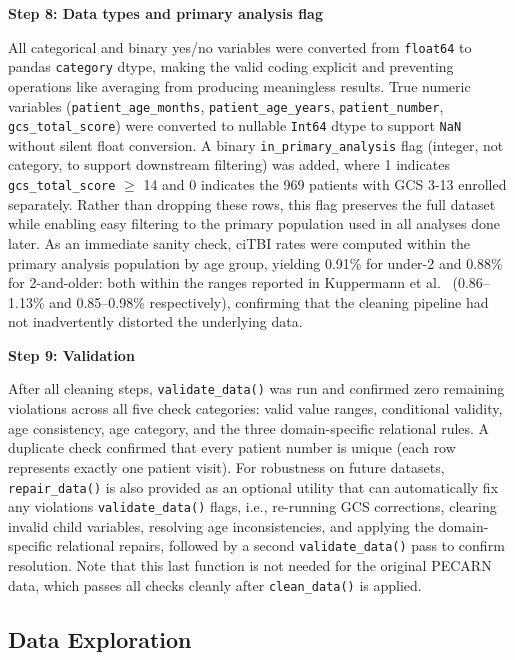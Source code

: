 \documentclass[11pt,letterpaper]{article}
\begin{document}
\textbf{Step 8: Data types and primary analysis flag}

All categorical and binary yes/no variables were converted from \texttt{float64} to pandas \texttt{category} dtype, making the valid coding explicit and preventing operations like averaging from producing meaningless results. True numeric variables (\texttt{patient\_age\_months}, \texttt{patient\_age\_years}, \texttt{patient\_number}, \texttt{gcs\_total\_score}) were converted to nullable \texttt{Int64} dtype to support \texttt{NaN} without silent float conversion. A binary \texttt{in\_primary\_analysis} flag (integer, not category, to support downstream filtering) was added, where 1 indicates \texttt{gcs\_total\_score} $\geq$ 14 and 0 indicates the 969 patients with GCS 3-13 enrolled separately. Rather than dropping these rows, this flag preserves the full dataset while enabling easy filtering to the primary population used in all analyses done later. As an immediate sanity check, ciTBI rates were computed within the primary analysis population by age group, yielding 0.91\% for under-2 and 0.88\% for 2-and-older: both within the ranges reported in Kuppermann et al.~\cite{kuppermann2009} (0.86--1.13\% and 0.85--0.98\% respectively), confirming that the cleaning pipeline had not inadvertently distorted the underlying data.

\textbf{Step 9: Validation}

After all cleaning steps, \texttt{validate\_data()} was run and confirmed zero remaining violations across all five check categories: valid value ranges, conditional validity, age consistency, age category, and the three domain-specific relational rules. A duplicate check confirmed that every patient number is unique (each row represents exactly one patient visit). For robustness on future datasets, \texttt{repair\_data()} is also provided as an optional utility that can automatically fix any violations \texttt{validate\_data()} flags, i.e., re-running GCS corrections, clearing invalid child variables, resolving age inconsistencies, and applying the domain-specific relational repairs, followed by a second \texttt{validate\_data()} pass to confirm resolution. Note that this last function is not needed for the original PECARN data, which passes all checks cleanly after \texttt{clean\_data()} is applied.


\subsection{Data Exploration}\label{data-exploration}
\end{document}
